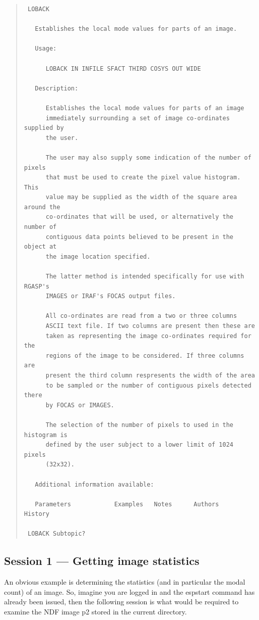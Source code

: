 \documentclass[twoside,11pt]{article}
\newcommand{\xlabel}[1]{}
\newenvironment{myquote}{\begin{quote}\begin{small}}{\end{small}\end{quote}}
\begin{document}
\begin{myquote}
\begin{verbatim}
 LOBACK
 
   Establishes the local mode values for parts of an image.
 
   Usage:
 
      LOBACK IN INFILE SFACT THIRD COSYS OUT WIDE
 
   Description:
 
      Establishes the local mode values for parts of an image
      immediately surrounding a set of image co-ordinates supplied by
      the user.
 
      The user may also supply some indication of the number of pixels
      that must be used to create the pixel value histogram. This
      value may be supplied as the width of the square area around the
      co-ordinates that will be used, or alternatively the number of
      contiguous data points believed to be present in the object at
      the image location specified.
 
      The latter method is intended specifically for use with RGASP's
      IMAGES or IRAF's FOCAS output files.
 
      All co-ordinates are read from a two or three columns
      ASCII text file. If two columns are present then these are
      taken as representing the image co-ordinates required for the
      regions of the image to be considered. If three columns are
      present the third column respresents the width of the area
      to be sampled or the number of contiguous pixels detected there
      by FOCAS or IMAGES.
 
      The selection of the number of pixels to used in the histogram is
      defined by the user subject to a lower limit of 1024 pixels
      (32x32).
 
   Additional information available:
 
   Parameters            Examples   Notes      Authors    History
 
 LOBACK Subtopic? 
\end{verbatim}
\end{myquote}


\subsection{Session 1 --- Getting image statistics}
\xlabel{SESSION1}

An obvious example is determining the statistics (and in particular the
modal count)  of an image. So, imagine you are logged in and the
espstart command has already been issued, then the following session is
what would be required to examine the NDF image p2 stored in the
current directory.
\end{document}
